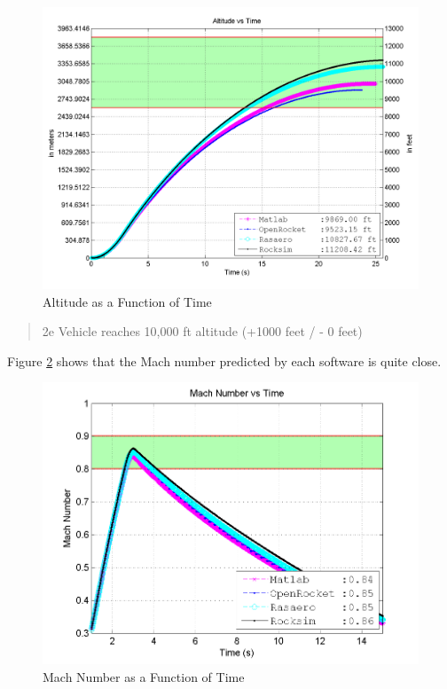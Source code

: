 \documentclass[]{article}
\begin{document}
\begin{figure}[htbp]
\centering
\includegraphics{images/plots/error_altitude_plot.png}
\caption{Altitude as a Function of Time
\label{error_altitude_plot_label}}
\end{figure}

\begin{quote}
2e Vehicle reaches 10,000 ft altitude (+1000 feet / - 0 feet)
\end{quote}

\clearpage

Figure \ref{error_mach_plot_label} shows that the Mach number predicted
by each software is quite close.

\begin{figure}[htbp]
\centering
\includegraphics{images/plots/error_mach_plot.png}
\caption{Mach Number as a Function of Time
\label{error_mach_plot_label}}
\end{figure}
\end{document}
